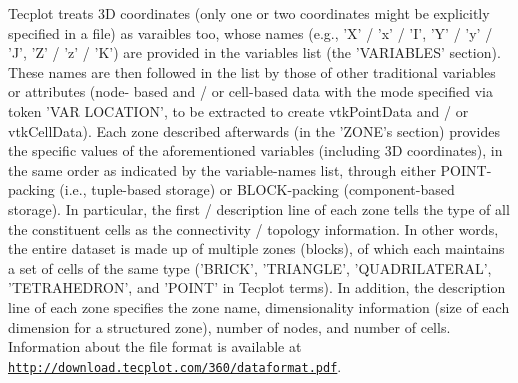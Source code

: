 Tecplot treats 3\-D coordinates (only one or two coordinates might be explicitly specified in a file) as varaibles too, whose names (e.\-g., 'X' / 'x' / 'I', 'Y' / 'y' / 'J', 'Z' / 'z' / 'K') are provided in the variables list (the 'V\-A\-R\-I\-A\-B\-L\-E\-S' section). These names are then followed in the list by those of other traditional variables or attributes (node-\/ based and / or cell-\/based data with the mode specified via token 'V\-A\-R L\-O\-C\-A\-T\-I\-O\-N', to be extracted to create vtk\-Point\-Data and / or vtk\-Cell\-Data). Each zone described afterwards (in the 'Z\-O\-N\-E's section) provides the specific values of the aforementioned variables (including 3\-D coordinates), in the same order as indicated by the variable-\/names list, through either P\-O\-I\-N\-T-\/packing (i.\-e., tuple-\/based storage) or B\-L\-O\-C\-K-\/packing (component-\/based storage). In particular, the first / description line of each zone tells the type of all the constituent cells as the connectivity / topology information. In other words, the entire dataset is made up of multiple zones (blocks), of which each maintains a set of cells of the same type ('B\-R\-I\-C\-K', 'T\-R\-I\-A\-N\-G\-L\-E', 'Q\-U\-A\-D\-R\-I\-L\-A\-T\-E\-R\-A\-L', 'T\-E\-T\-R\-A\-H\-E\-D\-R\-O\-N', and 'P\-O\-I\-N\-T' in Tecplot terms). In addition, the description line of each zone specifies the zone name, dimensionality information (size of each dimension for a structured zone), number of nodes, and number of cells. Information about the file format is available at \href{http://download.tecplot.com/360/dataformat.pdf}{\tt http\-://download.\-tecplot.\-com/360/dataformat.\-pdf}.

